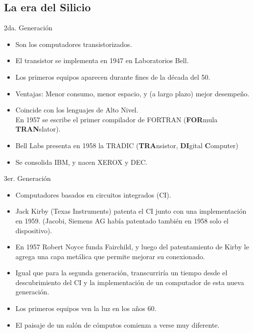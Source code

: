 \documentclass[table,dvipsnames,aspectratio=169]{beamer}
\begin{document}
\subsection{La era del Silicio}
\begin{frame}{2da. Generación}
  \begin{itemize}[<+(1)->] \justifying \parskip 0.3cm
   \item Son los computadores \textcolor{furfiBlue}{transistorizados}.
   \item El transistor se implementa en 1947 en Laboratorios Bell.%
   \item Los primeros equipos aparecen durante fines de la década del 50.
   \item \textcolor{furfiGreen}{Ventajas: Menor consumo, menor espacio, y (a largo plazo) mejor desempeño.}
   \item Coincide con los lenguajes de Alto Nivel.\\ En 1957 se escribe el primer compilador de FORTRAN (\textbf{FOR}mula \textbf{TRAN}slator).
   \item Bell Labs presenta en 1958 la TRADIC (\textbf{TRA}nsistor, \textbf{DI}gital \textbf{C}omputer)
   \item Se consolida IBM, y nacen XEROX y DEC.
  \end{itemize}
\end{frame}

\begin{frame}{3er. Generación}
  \begin{itemize}[<+(1)->] \justifying \parskip 0.4cm
   \item Computadores basados en \textcolor{furfiBlue}{circuitos integrados (CI)}.
   \item Jack Kirby (Texas Instruments) patenta el CI junto con una implementación en 1959. (Jacobi, Siemens AG había patentado también en 1958 solo el dispositivo).
   \item En 1957 Robert Noyce funda Fairchild, y luego del patentamiento de Kirby le agrega una capa metálica que permite mejorar su conexionado.
   \item Igual que para la segunda generación, transcurriría un tiempo desde el descubrimiento del CI y la implementación de un computador de esta nueva generación.
   \item \textcolor{furfiBlue}{Los primeros equipos ven la luz en los años 60.}
   \item \textcolor{furfiGreen}{El paisaje de un salón de cómputos comienza a verse muy diferente.}
  \end{itemize}
\end{frame}
\end{document}
